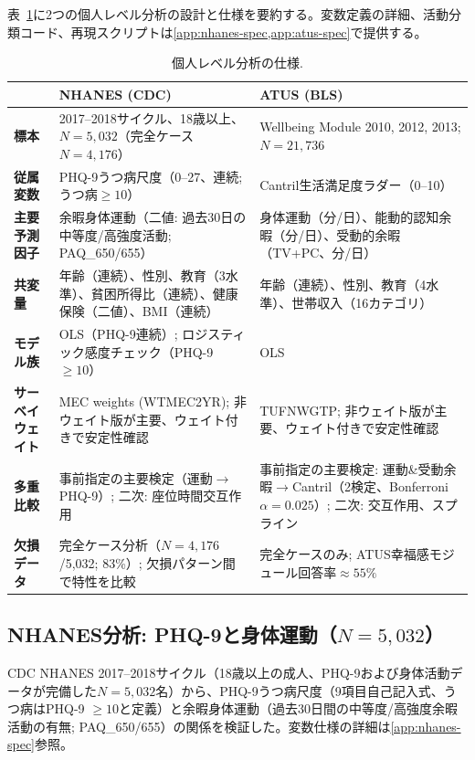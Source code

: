 \documentclass[a4paper,11pt,titlepage]{article}
\begin{document}
表~\ref{tab:micro-specs}に2つの個人レベル分析の設計と仕様を要約する。変数定義の詳細、活動分類コード、再現スクリプトは\cref{app:nhanes-spec,app:atus-spec}で提供する。

\begin{table}[htbp]
\centering
\caption{個人レベル分析の仕様.}
\label{tab:micro-specs}
\small
\begin{tabular}{p{3.0cm}p{5.8cm}p{5.8cm}}
\toprule
 & \textbf{NHANES (CDC)} & \textbf{ATUS (BLS)} \\
\midrule
\textbf{標本} & 2017--2018サイクル、18歳以上、$N = 5{,}032$（完全ケース$N = 4{,}176$） & Wellbeing Module 2010, 2012, 2013; $N = 21{,}736$ \\
\textbf{従属変数} & PHQ-9うつ病尺度（0--27、連続; うつ病$\geq 10$） & Cantril生活満足度ラダー（0--10） \\
\textbf{主要予測因子} & 余暇身体運動（二値: 過去30日の中等度/高強度活動; PAQ\_650/655） & 身体運動（分/日）、能動的認知余暇（分/日）、受動的余暇（TV+PC、分/日） \\
\textbf{共変量} & 年齢（連続）、性別、教育（3水準）、貧困所得比（連続）、健康保険（二値）、BMI（連続） & 年齢（連続）、性別、教育（4水準）、世帯収入（16カテゴリ） \\
\textbf{モデル族} & OLS（PHQ-9連続）; ロジスティック感度チェック（PHQ-9 $\geq 10$） & OLS \\
\textbf{サーベイウェイト} & MEC weights (WTMEC2YR); 非ウェイト版が主要、ウェイト付きで安定性確認 & TUFNWGTP; 非ウェイト版が主要、ウェイト付きで安定性確認 \\
\textbf{多重比較} & 事前指定の主要検定（運動$\to$PHQ-9）; 二次: 座位時間交互作用 & 事前指定の主要検定: 運動\&受動余暇$\to$Cantril（2検定、Bonferroni $\alpha = 0.025$）; 二次: 交互作用、スプライン \\
\textbf{欠損データ} & 完全ケース分析（$N = 4{,}176$/5{,}032; 83\%）; 欠損パターン間で特性を比較 & 完全ケースのみ; ATUS幸福感モジュール回答率$\approx 55\%$ \\
\bottomrule
\end{tabular}
\end{table}

\subsection{\texorpdfstring{NHANES分析: PHQ-9と身体運動（$N=5{,}032$）}{NHANES分析: PHQ-9と身体運動（N=5,032）}}\label{sec:nhanes}

CDC NHANES 2017--2018サイクル（18歳以上の成人、PHQ-9および身体活動データが完備した$N = 5{,}032$名）から、PHQ-9うつ病尺度（9項目自己記入式、うつ病はPHQ-9 $\geq 10$と定義）と余暇身体運動（過去30日間の中等度/高強度余暇活動の有無; PAQ\_650/655）の関係を検証した。変数仕様の詳細は\cref{app:nhanes-spec}参照。
\end{document}
